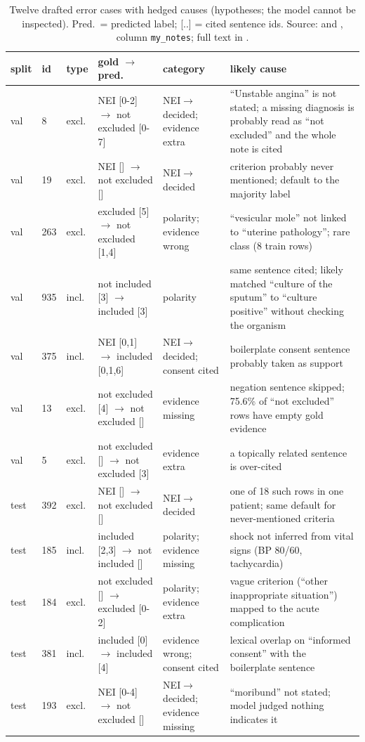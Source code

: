 \documentclass[conference]{IEEEtran}
\newcommand{\code}[1]{\texttt{#1}}
\begin{document}
\begin{table}[t]
\caption{Twelve drafted error cases with hedged causes (hypotheses; the model cannot be inspected). Pred.\ = predicted label; [..] = cited sentence ids. Source: \protect{} and \protect{}, column \code{my\_notes}; full text in \protect{}.}\label{tab:errors}
\centering\scriptsize\setlength{\tabcolsep}{3pt}
\begin{tabular}{llllp{3.4cm}p{6.6cm}}
\toprule
split & id & type & gold $\rightarrow$ pred. & category & likely cause\\
\midrule
val & 8 & excl. & NEI [0-2] $\rightarrow$ not excluded [0-7] & NEI$\rightarrow$decided; evidence extra & ``Unstable angina'' is not stated; a missing diagnosis is probably read as ``not excluded'' and the whole note is cited\\
val & 19 & excl. & NEI [] $\rightarrow$ not excluded [] & NEI$\rightarrow$decided & criterion probably never mentioned; default to the majority label\\
val & 263 & excl. & excluded [5] $\rightarrow$ not excluded [1,4] & polarity; evidence wrong & ``vesicular mole'' not linked to ``uterine pathology''; rare class (8 train rows)\\
val & 935 & incl. & not included [3] $\rightarrow$ included [3] & polarity & same sentence cited; likely matched ``culture of the sputum'' to ``culture positive'' without checking the organism\\
val & 375 & incl. & NEI [0,1] $\rightarrow$ included [0,1,6] & NEI$\rightarrow$decided; consent cited & boilerplate consent sentence probably taken as support\\
val & 13 & excl. & not excluded [4] $\rightarrow$ not excluded [] & evidence missing & negation sentence skipped; 75.6\% of ``not excluded'' rows have empty gold evidence\\
val & 5 & excl. & not excluded [] $\rightarrow$ not excluded [3] & evidence extra & a topically related sentence is over-cited\\
test & 392 & excl. & NEI [] $\rightarrow$ not excluded [] & NEI$\rightarrow$decided & one of 18 such rows in one patient; same default for never-mentioned criteria\\
test & 185 & incl. & included [2,3] $\rightarrow$ not included [] & polarity; evidence missing & shock not inferred from vital signs (BP 80/60, tachycardia)\\
test & 184 & excl. & not excluded [] $\rightarrow$ excluded [0-2] & polarity; evidence extra & vague criterion (``other inappropriate situation'') mapped to the acute complication\\
test & 381 & incl. & included [0] $\rightarrow$ included [4] & evidence wrong; consent cited & lexical overlap on ``informed consent'' with the boilerplate sentence\\
test & 193 & excl. & NEI [0-4] $\rightarrow$ not excluded [] & NEI$\rightarrow$decided; evidence missing & ``moribund'' not stated; model judged nothing indicates it\\
\bottomrule
\end{tabular}
\end{table}
\end{document}
